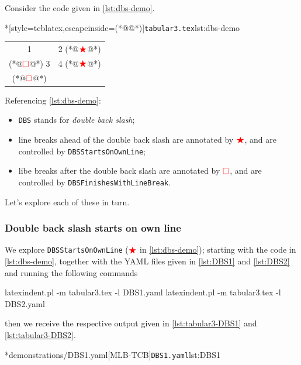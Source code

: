     Consider the code given in \cref{lst:dbs-demo}.
	\begin{cmhlistings}*[style=tcblatex,escapeinside={(*@}{@*)}]{\texttt{tabular3.tex}}{lst:dbs-demo}
\begin{tabular}{cc}
 1 & 2 (*@$\color{red}\bigstar$@*)\\(*@$\color{red}\square$@*) 3 & 4 (*@$\color{red}\bigstar$@*)\\(*@$\color{red}\square$@*)
\end{tabular}
\end{cmhlistings}
    Referencing \cref{lst:dbs-demo}:
      \begin{itemize}
        \item \texttt{DBS} stands for \emph{double back slash};
        \item line breaks ahead of the double back slash are annotated by $\color{red}\bigstar$, and are controlled by \texttt{DBSStartsOnOwnLine};
        \item libe breaks after the double back slash are annotated by $\color{red}\square$, and are controlled by \texttt{DBSFinishesWithLineBreak}.
      \end{itemize}

      Let's explore each of these in turn. 
      
      \subsubsection{Double back slash starts on own line}
      We explore \texttt{DBSStartsOnOwnLine} ($\color{red}\bigstar$ in \cref{lst:dbs-demo}); starting with 
      the code in \cref{lst:dbs-demo}, together with the YAML files given in \cref{lst:DBS1} and \cref{lst:DBS2}
      and running the following commands
	\begin{commandshell}
latexindent.pl -m tabular3.tex -l DBS1.yaml
latexindent.pl -m tabular3.tex -l DBS2.yaml
            \end{commandshell}
      then we receive the respective output given in \cref{lst:tabular3-DBS1} and \cref{lst:tabular3-DBS2}.

        \begin{cmhtcbraster}[raster column skip=.01\linewidth]
		\cmhlistingsfromfile*[style=yaml-LST]*{demonstrations/DBS1.yaml}[MLB-TCB]{\texttt{DBS1.yaml}}{lst:DBS1}
        \end{cmhtcbraster}

